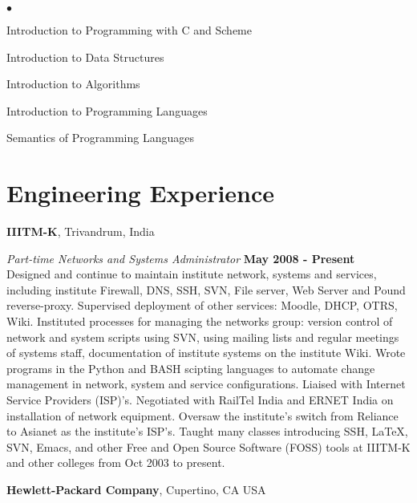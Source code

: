 \documentclass[11pt,margin,line]{res}
\newenvironment{list2}{
  \begin{list}{$\bullet$}{%
      \setlength{\itemsep}{0in}
      \setlength{\parsep}{0in} \setlength{\parskip}{0in}
      \setlength{\topsep}{0in} \setlength{\partopsep}{0in} 
      \setlength{\leftmargin}{0.2in}}}{\end{list}}
\begin{document}
\begin{resume}
\vspace*{.05in}  
\begin{list2}
\item Introduction to Programming with C and Scheme
\item Introduction to Data Structures
\item Introduction to Algorithms
\item Introduction to Programming Languages 
\item Semantics of Programming Languages
\end{list2}



\newpage

\section{\sc Engineering Experience}

{\bf IIITM-K}, Trivandrum, India

\vspace{-.5cm}

{\em Part-time Networks and Systems Administrator} \hfill
{\bf May 2008 - Present}\\ 
Designed and continue to maintain institute network, systems
and services, including institute Firewall, DNS, SSH, SVN,
File server, Web Server and Pound reverse-proxy.  Supervised
deployment of other services: Moodle, DHCP, OTRS, Wiki.
Instituted processes for managing the networks group:
version control of network and system scripts using SVN,
using mailing lists and regular meetings of systems staff,
documentation of institute systems on the institute Wiki.
Wrote programs in the Python and BASH scipting languages to
automate change management in network, system and service
configurations.  Liaised with Internet Service Providers
(ISP)'s.  Negotiated with RailTel India and ERNET India on
installation of network equipment.  Oversaw the institute's
switch from Reliance to Asianet as the institute's ISP's.
Taught many classes introducing SSH, LaTeX, SVN, Emacs, and
other Free and Open Source Software (FOSS) tools at IIITM-K
and other colleges from Oct 2003 to present.

{\bf Hewlett-Packard Company}, Cupertino, CA USA

\vspace{-.5cm}


\end{resume}
\end{document}
